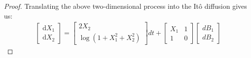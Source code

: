 \documentclass[11pt]{article}
\newcommand{\mrm}{\mathrm}
\newcommand{\diff}{\mrm{d}}
\begin{document}
\begin{enumerate}
 \begin{proof}
 Translating the above two-dimensional process into the It\^o diffusion gives us:
 \begin{align*}
 \begin{bmatrix}
 \diff X_1 \\ \diff X_2
 \end{bmatrix}=
 \begin{bmatrix}
 2 X_2 \\ \log(1+X_1^2 +X_2^2)
 \end{bmatrix} dt +
 \begin{bmatrix}
 X_1 & 1 \\ 1 & 0
 \end{bmatrix}
 \begin{bmatrix}
 dB_1 \\ dB_2
 \end{bmatrix}
 \end{align*}
 \end{proof}
 \end{enumerate}
\end{document}
